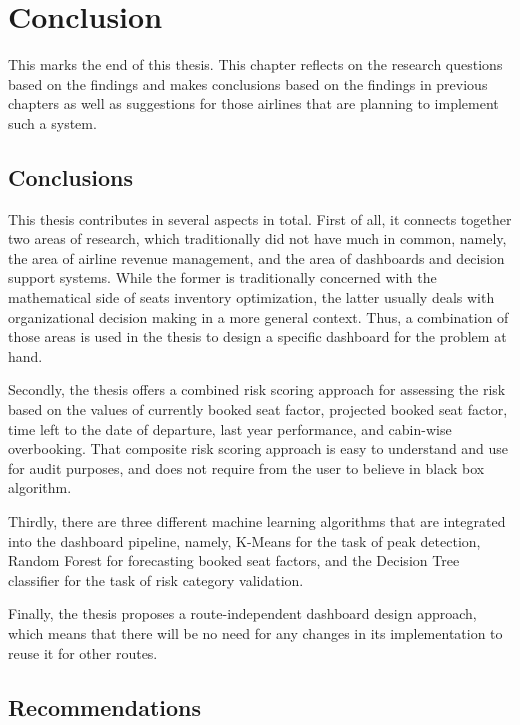 \chapter{Conclusion}
\label{ch:conclusion}

This marks the end of this thesis. This chapter reflects on the research questions based on the findings and makes conclusions based on the findings in previous chapters as well as suggestions for those airlines that are planning to implement such a system.

\section{Conclusions}

This thesis contributes in several aspects in total. First of all, it connects together two areas of research, which traditionally did not have much in common, namely, the area of airline revenue management, and the area of dashboards and decision support systems. While the former is traditionally concerned with the mathematical side of seats inventory optimization, the latter usually deals with organizational decision making in a more general context. Thus, a combination of those areas is used in the thesis to design a specific dashboard for the problem at hand.

Secondly, the thesis offers a combined risk scoring approach for assessing the risk based on the values of currently booked seat factor, projected booked seat factor, time left to the date of departure, last year performance, and cabin-wise overbooking. That composite risk scoring approach is easy to understand and use for audit purposes, and does not require from the user to believe in black box algorithm.

Thirdly, there are three different machine learning algorithms that are integrated into the dashboard pipeline, namely, K-Means for the task of peak detection, Random Forest for forecasting booked seat factors, and the Decision Tree classifier for the task of risk category validation.

Finally, the thesis proposes a route-independent dashboard design approach, which means that there will be no need for any changes in its implementation to reuse it for other routes.

\section{Recommendations}

